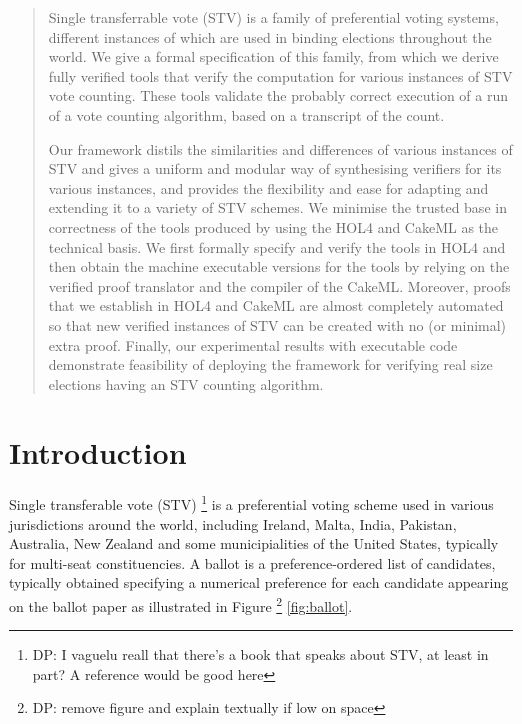 \documentclass[10pt,conference]{IEEEtran}
\begin{document}
\maketitle
\begin{abstract}
Single transferrable vote (STV) is a family of preferential voting systems, different instances of which are used in binding elections throughout the world. We give a formal specification of this family, from which we derive fully verified tools that verify the computation for various instances of STV vote counting. These tools validate the probably correct execution of a run of a vote counting algorithm, based on a transcript of the count.

Our framework distils the similarities and differences of various instances of STV and gives a uniform and modular way of synthesising verifiers for its various instances, and provides the flexibility and ease for adapting and extending it to a variety of STV schemes. We minimise the trusted base in correctness of the tools produced by using the HOL4 and CakeML as the technical basis. We first formally specify and verify the tools in HOL4 and then obtain the machine executable versions for the tools by relying on the verified proof translator and the compiler of the CakeML. Moreover, proofs that we establish in HOL4 and CakeML are almost completely automated so that new verified instances of STV can be created with no (or minimal) extra proof. Finally, our experimental results with executable code demonstrate feasibility of deploying the framework for verifying real size elections having an STV counting algorithm.
\end{abstract}

\begin{IEEEkeywords}

\end{IEEEkeywords}
\section{Introduction}\label{sec:intro}

Single transferable vote (STV) \footnote{DP: I vaguelu reall that
there's a book that speaks about STV, at least in part? A reference
would be good here} is a preferential voting scheme used
in various jurisdictions around the world, including Ireland, Malta,
India, Pakistan, Australia, New Zealand and some municipialities of
the United States, typically for multi-seat constituencies. 
A ballot is a preference-ordered list of
candidates, typically obtained specifying a numerical preference
for each candidate appearing on the ballot paper as illustrated in Figure
\footnote{DP: remove figure and explain textually if low on space}
\ref{fig:ballot}. 
\end{document}
